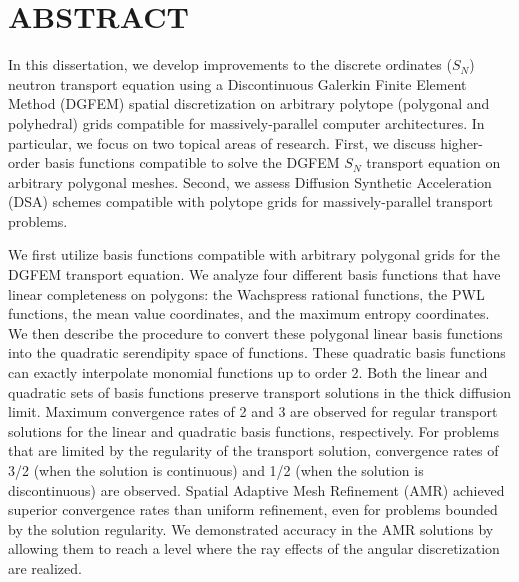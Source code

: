 %
%
%

\chapter*{ABSTRACT}

\pagestyle{plain} %
\setcounter{page}{2}

\indent In this dissertation, we develop improvements to the discrete ordinates ($S_N$) neutron transport equation using a Discontinuous Galerkin Finite Element Method (DGFEM) spatial discretization on arbitrary polytope (polygonal and polyhedral) grids compatible for massively-parallel computer architectures. In particular, we focus on two topical areas of research. First, we discuss higher-order basis functions compatible to solve the DGFEM $S_N$ transport equation on arbitrary polygonal meshes. Second, we assess Diffusion Synthetic Acceleration (DSA) schemes compatible with polytope grids for massively-parallel transport problems.

We first utilize basis functions compatible with arbitrary polygonal grids for the DGFEM transport equation. We analyze four different basis functions that have linear completeness on polygons: the Wachspress rational functions, the PWL functions, the mean value coordinates, and the maximum entropy coordinates. We then describe the procedure to convert these polygonal linear basis functions into the quadratic serendipity space of functions. These quadratic basis functions can exactly interpolate monomial functions up to order 2. Both the linear and quadratic sets of basis functions preserve transport solutions in the thick diffusion limit. Maximum convergence rates of 2 and 3 are observed for regular transport solutions for the linear and quadratic basis functions, respectively. For problems that are limited by the regularity of the transport solution, convergence rates of 3/2 (when the solution is continuous) and 1/2 (when the solution is discontinuous) are observed. Spatial Adaptive Mesh Refinement (AMR) achieved superior convergence rates than uniform refinement, even for problems bounded by the solution regularity. We demonstrated accuracy in the AMR solutions by allowing them to reach a level where the ray effects of the angular discretization are realized.

